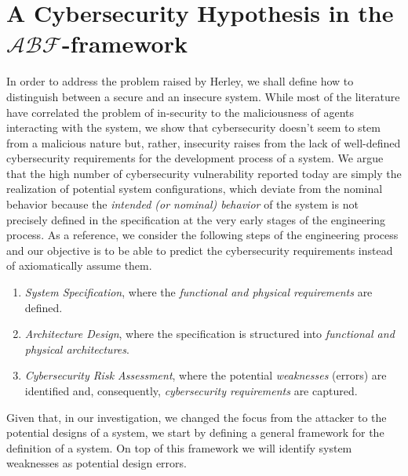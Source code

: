 \documentclass[conference]{IEEEtran}
\newcommand{\assertionRegion}{\mathcal{A}}
\newcommand{\beliefRegion}{\mathcal{B}}
\newcommand{\factRegion}{\mathcal{F}}
\newcommand{\abftheory}{\assertionRegion\beliefRegion\factRegion}
\begin{document}
\section{A Cybersecurity Hypothesis in the $\abftheory$-framework}\label{sec:hypothesis}
In order to address the problem raised by Herley, we shall define how to
distinguish between a secure and an insecure system. While most of the
literature have correlated the problem of in-security
to the maliciousness of agents interacting with the system, we show that
cybersecurity doesn't seem to stem from a malicious nature but, rather, insecurity
raises from the lack of well-defined cybersecurity requirements for the development
process of a system. We argue that the high number of cybersecurity vulnerability
reported today are simply the realization of potential system configurations,
which deviate from the nominal behavior because the \emph{intended (or
nominal) behavior} of the system is not precisely defined in the specification
at the very early stages of the engineering process.
As a reference, we consider the following steps of the engineering process
and our objective is to be able to predict the cybersecurity requirements
instead of axiomatically assume them.
\begin{enumerate}
	\item \emph{System Specification}, where the \emph{functional and physical requirements} are defined.
	\item \emph{Architecture Design}, where the specification is structured into \emph{functional and physical architectures}.
	\item \emph{Cybersecurity Risk Assessment}, where the potential \emph{weaknesses} (errors)
		are identified and, consequently, \emph{cybersecurity requirements} are
		captured.
\end{enumerate}
Given that, in our investigation, we changed the focus from the attacker to the
potential designs of a system, we start by defining a general framework for the definition
of a system. On top of this framework we will identify system weaknesses as potential
design errors.
\end{document}
